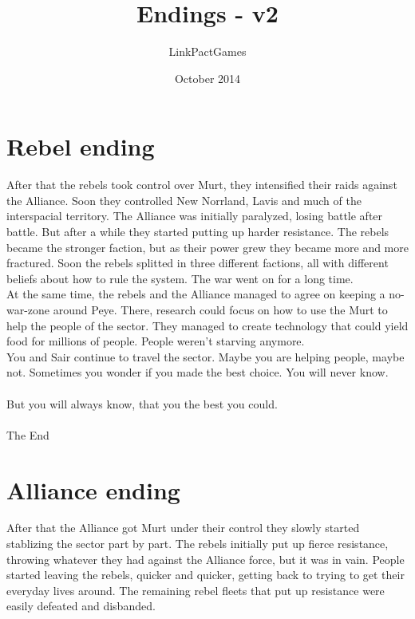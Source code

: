 \documentclass[a4paper,12pt]{article}
\begin{document}
\title{Endings - v2}
\author{LinkPactGames}
\date{October 2014}
\maketitle

\section{Rebel ending}

After that the rebels took control over Murt, they intensified their raids against the Alliance.
Soon they controlled New Norrland, Lavis and much of the interspacial territory.
The Alliance was initially paralyzed, losing battle after battle. But after a while they started
putting up harder resistance.
The rebels became the stronger faction, but as their power grew they became more and more fractured.
Soon the rebels splitted in three different factions, all with different beliefs about how to rule the system.
The war went on for a long time.\\

At the same time, the rebels and the Alliance managed to agree on keeping a no-war-zone around Peye.
There, research could focus on how to use the Murt to help the people of the sector. They managed to create technology that
could yield food for millions of people. People weren't starving anymore.\\

You and Sair continue to travel the sector. Maybe you are helping people, maybe not.
Sometimes you wonder if you made the best choice. You will never know.\\\\
But you will always know, that you the best you could.\\\\
The End

\section{Alliance ending}

After that the Alliance got Murt under their control they slowly started stablizing the sector part by part.
The rebels initially put up fierce resistance, throwing whatever they had against the Alliance force, but it was in vain. 
People started leaving the rebels, quicker and quicker, getting back to trying to get their everyday lives around.
The remaining rebel fleets that put up resistance were easily defeated and disbanded.\\
\end{document}
